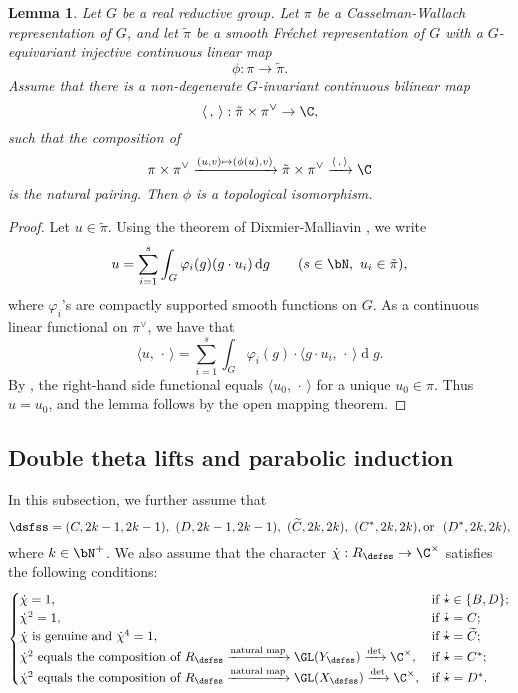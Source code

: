 \documentclass[12pt,a4paper]{amsart}
\newcommand{\od}{\operatorname{d}}
\newcommand{\la}{\langle}
\newcommand{\ra}{\rangle}
\newcommand{\be}{\begin {equation}}
\newcommand{\ee}{\end {equation}}
\numberwithin{equation}{section}
\newtheorem{lem}[thm]{Lemma}
\theoremstyle{remark}
\begin{document}
\begin{lem}\label{imb2}
Let $G$ be a real reductive group. Let $\pi$ be a Casselman-Wallach representation of $G$, and let $\tilde \pi$ be a smooth Fr\'echet representation of $G$ with a $G$-equivariant injective continuous linear map
\[
  \phi: \pi\rightarrow \tilde \pi.
\]
Assume that  there is a non-degenerate $G$-invariant continuous bilinear map
\[
\la\,,\,\ra: \tilde \pi\times \pi^\vee\rightarrow \C,
\]
such that the composition of
\[
 \pi\times \pi^\vee\xrightarrow{(u,v)\mapsto (\phi(u),v)} \tilde \pi\times \pi^\vee\xrightarrow{\la\,,\,\ra} \C
\]
is the natural pairing. Then $\phi$ is a topological isomorphism.
\end{lem}
\begin{proof}
 Let $u\in \tilde \pi$.
 Using the theorem of Dixmier-Malliavin \cite[Theorem 3.3]{DM}, we write
 \[
   u=\sum_{i=1}^{s} \int_G \varphi_i(g) ( g\cdot u_i)\od\! g \qquad (s\in \bN, \ u_i\in\tilde \pi),
 \]
 where $\varphi_i$'s are compactly supported smooth functions on $G$.  As a continuous linear functional on $\pi^\vee$, we have that
  \[
   \la u,\, \cdot\, \ra=\sum_{i=1}^{s} \int_G \varphi_i(g)  \cdot \la g\cdot u_i, \,\cdot\,\ra \od\! g.
 \]
By \cite[Lemma 3.5]{SZ1},  the right-hand side  functional  equals  $\la u_0, \,\cdot\,\ra$ for a unique $u_0\in \pi$. Thus $u=u_0$, and the lemma follows by the open mapping theorem.

\end{proof}

\subsection{Double theta lifts and parabolic induction}
In this subsection, we further assume that
\[
 \dsfss= (C, 2k-1, 2k-1), \ (D, 2k-1, 2k-1), \ (\widetilde C, 2k, 2k), \ (C^*, 2k, 2k), \textrm{or }\ (D^*, 2k, 2k),
\]
where $k\in \bN^+$.
We also assume that the character $\dot \chi: R_{\dsfss}\rightarrow \C^\times $
satisfies  the following conditions:
\be\label{chid}
\begin{cases}
  \dot \chi=1,\quad   &\textrm{if }\dot \star\in \{B,D\};\\
 \dot \chi^2=1,  & \textrm{if $\dot \star=C$;}\\
 \dot \chi \textrm{ is genuine and $\dot \chi^4=1$,}& \textrm{if $\dot \star=\widetilde C$};\\
  \dot \chi^2\textrm{ equals the composition of $R_\dsfss\xrightarrow{\textrm{natural map}} \GL(Y_\dsfss)\xrightarrow{\det}\C^\times$},  & \textrm{if $\dot \star=C^*$;}\\
   \dot \chi^2\textrm{ equals the composition of $R_\dsfss\xrightarrow{\textrm{natural map}} \GL(X_\dsfss)\xrightarrow{\det}\C^\times$},  & \textrm{if $\dot \star=D^*$.}
\end{cases}
\ee
\end{document}
